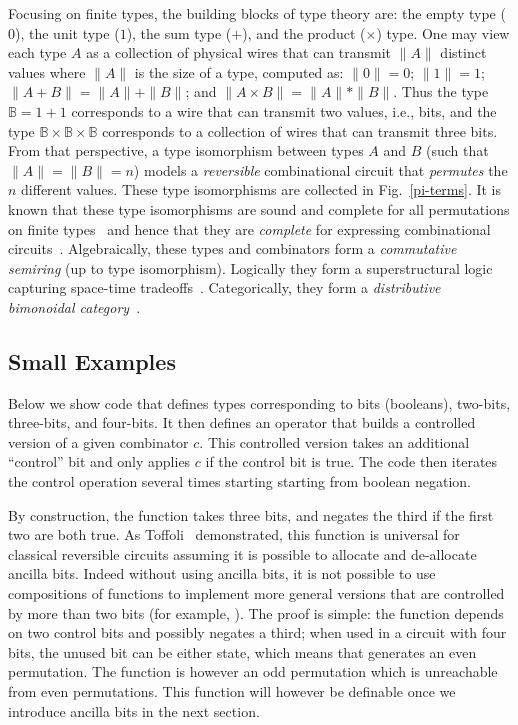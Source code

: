 \documentclass[sigplan,10pt,review,anonymous]{acmart}
\begin{document}
Focusing on finite types, the building blocks of type theory are: the
empty type ($0$), the unit type ($1$), the sum type ($+$), and the
product ($\times$) type. One may view each type $A$ as a collection of
physical wires that can transmit $\|A\|$ distinct values where $\|A\|$
is the size of a type, computed as: $\| 0 \| = 0$; $\| 1 \| = 1$;
$\| A + B \| = \| A \| + \| B \|$; and
$\| A \times B \| = \| A \| * \| B \|$. Thus the type
$\mathbb{B} = 1 + 1$ corresponds to a wire that can transmit two
values, i.e., bits, and the type
$\mathbb{B} \times \mathbb{B} \times \mathbb{B}$ corresponds to a
collection of wires that can transmit three bits. From that
perspective, a type isomorphism between types $A$ and $B$ (such that
$\|A\|=\|B\|=n$) models a \emph{reversible} combinational circuit that
\emph{permutes} the $n$ different values. These type isomorphisms are
collected in Fig.~\ref{pi-terms}. It is known that these type
isomorphisms are sound and complete for all permutations on finite
types~\cite{Fiore:2004,fiore-remarks} and hence that they are
\emph{complete} for expressing combinational
circuits~\cite{fredkin1982conservative,James:2012:IE:2103656.2103667,Toffoli:1980}. Algebraically,
these types and combinators form a \emph{commutative semiring} (up to
type isomorphism). Logically they form a superstructural logic
capturing space-time tradeoffs~\cite{superstructural}. Categorically,
they form a \emph{distributive bimonoidal category}~\cite{laplaza72}.

\subsection{Small Examples}
\label{sub:toff}

Below we show code that defines types corresponding to bits (booleans),
two-bits, three-bits, and four-bits. It then defines an operator that
builds a controlled version of a given combinator $c$. This controlled
version takes an additional ``control'' bit and only applies $c$ if
the control bit is true. The code then iterates the control operation
several times starting starting from boolean negation.

\Bexamples{}

By construction, the  function takes three bits,
and negates the third if the first two are both true. As
Toffoli~\cite{Toffoli:1980} demonstrated, this function is universal
for classical reversible circuits assuming it is possible to allocate
and de-allocate ancilla bits. Indeed without using ancilla bits, it is
not possible to use compositions of  functions
to implement more general versions that are controlled by more than
two bits (for example, ). The proof is simple:
the  function depends on two control bits and
possibly negates a third; when used in a circuit with four bits, the
unused bit can be either state, which means that
 generates an even permutation. The function
 is however an odd permutation which is
unreachable from even permutations. This function will however be
definable once we introduce ancilla bits in the next section.
\end{document}
